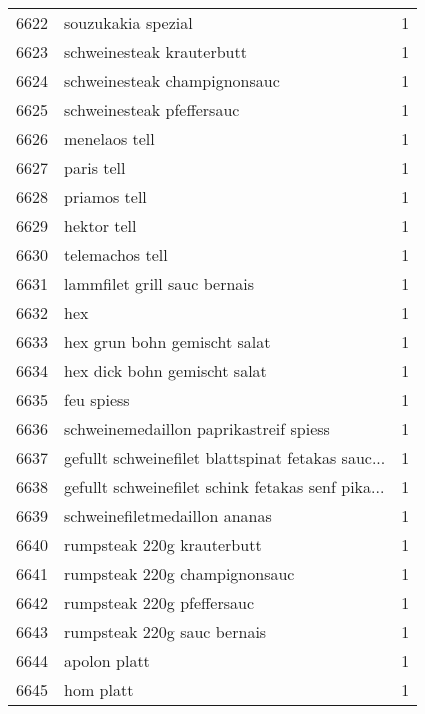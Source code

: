 \begin{tabular}{llr}
6622 &                                 souzukakia spezial &      1 \\
6623 &                          schweinesteak krauterbutt &      1 \\
6624 &                       schweinesteak champignonsauc &      1 \\
6625 &                          schweinesteak pfeffersauc &      1 \\
6626 &                                      menelaos tell &      1 \\
6627 &                                         paris tell &      1 \\
6628 &                                       priamos tell &      1 \\
6629 &                                        hektor tell &      1 \\
6630 &                                    telemachos tell &      1 \\
6631 &                       lammfilet grill sauc bernais &      1 \\
6632 &                                                hex &      1 \\
6633 &                       hex grun bohn gemischt salat &      1 \\
6634 &                       hex dick bohn gemischt salat &      1 \\
6635 &                                         feu spiess &      1 \\
6636 &             schweinemedaillon paprikastreif spiess &      1 \\
6637 &  gefullt schweinefilet blattspinat fetakas sauc... &      1 \\
6638 &  gefullt schweinefilet schink fetakas senf pika... &      1 \\
6639 &                      schweinefiletmedaillon ananas &      1 \\
6640 &                         rumpsteak 220g krauterbutt &      1 \\
6641 &                      rumpsteak 220g champignonsauc &      1 \\
6642 &                         rumpsteak 220g pfeffersauc &      1 \\
6643 &                        rumpsteak 220g sauc bernais &      1 \\
6644 &                                       apolon platt &      1 \\
6645 &                                          hom platt &      1 \\

\end{tabular}
